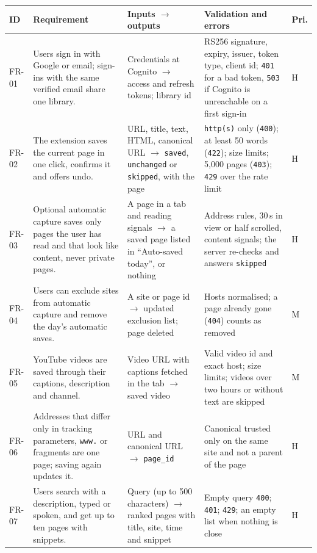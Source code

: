{\footnotesize
\begin{longtable}{>{\ttfamily}p{} >{\raggedright\arraybackslash}p{} >{\raggedright\arraybackslash}p{} >{\raggedright\arraybackslash}p{} p{}}
\toprule
\textrm{\textbf{ID}} & \textbf{Requirement} & \textbf{Inputs $\rightarrow$ outputs} & \textbf{Validation and errors} & \textbf{Pri.} \\
\midrule
\endhead
FR-01 & Users sign in with Google or email; sign-ins with the same verified email share one library. & Credentials at Cognito $\rightarrow$ access and refresh tokens; library id & RS256 signature, expiry, issuer, token type, client id; \texttt{401} for a bad token, \texttt{503} if Cognito is unreachable on a first sign-in & H \\
FR-02 & The extension saves the current page in one click, confirms it and offers undo. & URL, title, text, HTML, canonical URL $\rightarrow$ \texttt{saved}, \texttt{unchanged} or \texttt{skipped}, with the page & \texttt{http(s)} only (\texttt{400}); at least 50 words (\texttt{422}); size limits; 5{,}000 pages (\texttt{403}); \texttt{429} over the rate limit & H \\
FR-03 & Optional automatic capture saves only pages the user has read and that look like content, never private pages. & A page in a tab and reading signals $\rightarrow$ a saved page listed in ``Auto-saved today'', or nothing & Address rules, 30\,s in view or half scrolled, content signals; the server re-checks and answers \texttt{skipped} & H \\
FR-04 & Users can exclude sites from automatic capture and remove the day's automatic saves. & A site or page id $\rightarrow$ updated exclusion list; page deleted & Hosts normalised; a page already gone (\texttt{404}) counts as removed & M \\
FR-05 & YouTube videos are saved through their captions, description and channel. & Video URL with captions fetched in the tab $\rightarrow$ saved video & Valid video id and exact host; size limits; videos over two hours or without text are skipped & M \\
FR-06 & Addresses that differ only in tracking parameters, \texttt{www.} or fragments are one page; saving again updates it. & URL and canonical URL $\rightarrow$ \texttt{page\_id} & Canonical trusted only on the same site and not a parent of the page & H \\
FR-07 & Users search with a description, typed or spoken, and get up to ten pages with snippets. & Query (up to 500 characters) $\rightarrow$ ranked pages with title, site, time and snippet & Empty query \texttt{400}; \texttt{401}; \texttt{429}; an empty list when nothing is close & H \\

\end{longtable}}
